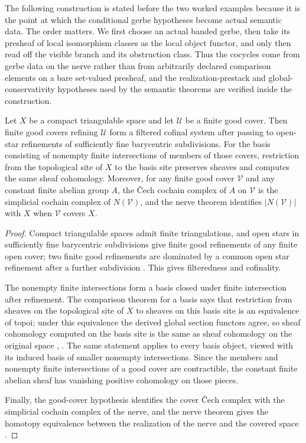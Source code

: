 ﻿The following construction is stated before the two worked examples because it
is the point at which the conditional gerbe hypotheses become actual semantic
data. The order matters. We first choose an actual banded gerbe, then take its
presheaf of local isomorphism classes as the local object functor, and only then
read off the visible branch and its obstruction class. Thus the cocycles come
from gerbe data on the nerve rather than from arbitrarily declared comparison
elements on a bare set-valued presheaf, and the realization-prestack and
global-conservativity hypotheses used by the semantic theorems are verified
inside the construction.

\begin{lemma}\label{lem:good-cover-site-tools}
Let $X$ be a compact triangulable space and let $\mathcal U$ be a finite good
cover. Then finite good covers refining $\mathcal U$ form a filtered cofinal
system after passing to open-star refinements of sufficiently fine barycentric
subdivisions. For the basis consisting of nonempty finite intersections of
members of those covers, restriction from the topological site of $X$ to the
basis site preserves sheaves and computes the same sheaf cohomology. Moreover,
for any finite good cover $\mathcal V$ and any constant finite abelian group
$A$, the \v{C}ech cochain complex of $A$ on $\mathcal V$ is the simplicial
cochain complex of $N(\mathcal V)$, and the nerve theorem identifies
$|N(\mathcal V)|$ with $X$ when $\mathcal V$ covers $X$.
\end{lemma}

\begin{proof}
Compact triangulable spaces admit finite triangulations, and open stars in
sufficiently fine barycentric subdivisions give finite good refinements of any
finite open cover; two finite good refinements are dominated by a common open
star refinement after a further subdivision
\cite[Sec.~2.1 and Chap.~4]{Hatcher2002}. This gives filteredness and
cofinality.

The nonempty finite intersections form a basis closed under finite
intersection after refinement. The comparison theorem for a basis says that
restriction from sheaves on the topological site of $X$ to sheaves on this
basis site is an equivalence of topoi; under this equivalence the derived
global section functors agree, so sheaf cohomology computed on the basis site is
the same as sheaf cohomology on the original space
\cite[Chap.~III, Secs.~2--4]{MacLaneMoerdijk1994},
\cite[Sec.~4.1]{Bredon1997}. The same statement applies to every basis object,
viewed with its induced basis of smaller nonempty intersections. Since the
members and nonempty finite intersections of a good cover are contractible,
the constant finite abelian sheaf has vanishing positive cohomology on those
pieces.

Finally, the good-cover hypothesis identifies the cover \v{C}ech complex with
the simplicial cochain complex of the nerve, and the nerve theorem gives the
homotopy equivalence between the realization of the nerve and the covered
space \cite[Sec.~4G]{Hatcher2002}.
\end{proof}

